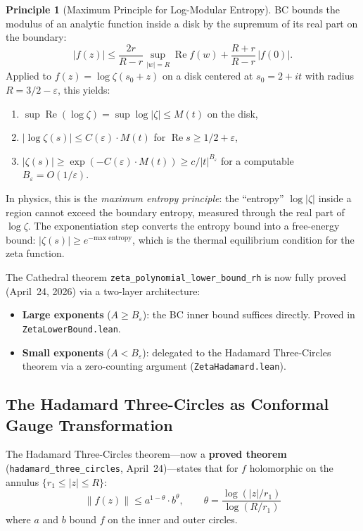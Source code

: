 \documentclass[11pt,a4paper]{article}
\theoremstyle{definition}
\newtheorem{principle}[definition]{Principle}
\newcommand{\re}{\operatorname{Re}}
\newcommand{\lean}[1]{\texttt{#1}}
\begin{document}
\begin{principle}[Maximum Principle for Log-Modular Entropy]
BC bounds the modulus of an analytic function inside a disk by the
supremum of its real part on the boundary:
\[
  |f(z)| \leq \frac{2r}{R - r}\sup_{|w| = R} \re f(w)
  + \frac{R + r}{R - r}\,|f(0)|.
\]
Applied to $f(z) = \log\zeta(s_0 + z)$ on a disk centered at $s_0 = 2 + it$
with radius $R = 3/2 - \varepsilon$, this yields:
\begin{enumerate}
  \item $\sup \re(\log\zeta) = \sup \log|\zeta| \leq M(t)$ on the disk,
  \item $|\log\zeta(s)| \leq C(\varepsilon) \cdot M(t)$ for
    $\re s \geq 1/2 + \varepsilon$,
  \item $|\zeta(s)| \geq \exp(-C(\varepsilon) \cdot M(t))
    \geq c/|t|^{B_\varepsilon}$ for a computable $B_\varepsilon = O(1/\varepsilon)$.
\end{enumerate}

In physics, this is the \emph{maximum entropy principle}: the
``entropy'' $\log|\zeta|$ inside a region cannot exceed the
boundary entropy, measured through the real part of $\log\zeta$.
The exponentiation step converts the entropy bound into a
free-energy bound: $|\zeta(s)| \geq e^{-\text{max entropy}}$,
which is the thermal equilibrium condition for the zeta function.

The Cathedral theorem \lean{zeta\_polynomial\_lower\_bound\_rh} is now
fully proved (April~24, 2026) via a two-layer architecture:
\begin{itemize}
  \item \textbf{Large exponents} ($A \geq B_\varepsilon$): the BC inner bound
    suffices directly. Proved in \lean{ZetaLowerBound.lean}.
  \item \textbf{Small exponents} ($A < B_\varepsilon$): delegated to the
    Hadamard Three-Circles theorem via a zero-counting argument
    (\lean{ZetaHadamard.lean}).
\end{itemize}
\end{principle}

\subsection{The Hadamard Three-Circles as Conformal Gauge Transformation}

The Hadamard Three-Circles theorem---now a \textbf{proved theorem}
(\lean{hadamard\_three\_circles}, April~24)---states that for $f$
holomorphic on the annulus $\{r_1 \leq |z| \leq R\}$:
\[
  \|f(z)\| \leq a^{1-\theta} \cdot b^\theta,
  \qquad \theta = \frac{\log(|z|/r_1)}{\log(R/r_1)}
\]
where $a$ and $b$ bound $f$ on the inner and outer circles.
\end{document}
